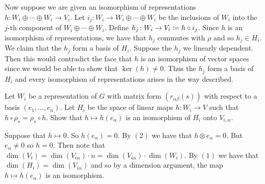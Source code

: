 \documentclass[letterpaper, 11pt, oneside]{book}
\begin{document}
\begin{pf}
\begin{enumerate}
        Now suppose we are given an isomorphism of representations $h\colon W_{i} \oplus \cdots \oplus W_{i} \to V_{i}$.
        Let $i_{j}\colon W_{i} \to W_{i} \oplus \cdots \oplus W_{i}$ be the inclusions of $W_{i}$ into the $j$-th component of $W_{i} \oplus \cdots \oplus W_{i}$.
        Define $h_{j}\colon W_{i} \to V_{i} \coloneqq h \circ i_{j}$.
        Since $h$ is an isomorphism of representations, we have that $h_{j}$ commutes with $\rho$ and so $h_{j} \in H_{i}$.
        We claim that the $h_{j}$ form a basis of $H_{i}$.
        Suppose the $h_{j}$ we linearly dependent.
        Then this would contradict the face that $h$ is an isomorphism of vector spaces since we would be able to show that $\ker(h) \neq 0$.
        Thus the $h_{j}$ form a basis of $H_{i}$ and every isomorphism of representations arises in the way described.
  \end{enumerate}
\end{pf}

\begin{exercise}
  Let $W_{i}$ be a representation of $G$ with matrix form $(r_{\alpha \beta}(s))$ with respect to a basis $(e_{1}, \ldots, e_{n})$.
  Let $H_{i}$ be the space of linear maps $h\colon W_{i} \to V$ such that $h \circ \rho_{s} = \rho_{s} \circ h$.
  Show that $h \mapsto h(e_{\alpha})$ is an isomorphism of $H_{i}$ onto $V_{i, \alpha}$.
\end{exercise}
\begin{pf}
  Suppose that $h \mapsto 0$.
  So $h(e_{\alpha}) = 0$.
  By  $(2)$ we have that $h \otimes e_{\alpha} = 0$.
  But $e_{\alpha} \neq 0$ so $h = 0$.
  Then note that $\dim(V_{i}) = \dim(V_{i \alpha}) \cdot n = \dim(V_{i \alpha}) \cdot \dim(W_{i})$.
  By  $(1)$ we have that $\dim(H_{i}) = \dim(V_{i \alpha})$ and so by a dimension argument, the map $h \mapsto h(e_{\alpha})$ is an isomorphism.
\end{pf}

\printbibliography
\end{document}
